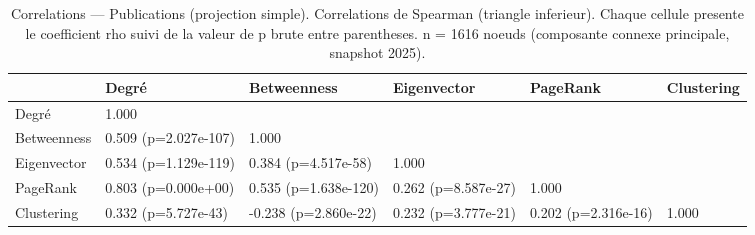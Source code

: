 \begin{table}
\caption{Correlations — Publications (projection simple). Correlations de Spearman (triangle inferieur). Chaque cellule presente le coefficient rho suivi de la valeur de p brute entre parentheses. n = 1616 noeuds (composante connexe principale, snapshot 2025).}
\label{tab:corr_heatmap_corr_publications_simple}
\begin{tabular}{llllll}
\toprule
 & Degré & Betweenness & Eigenvector & PageRank & Clustering \\
\midrule
Degré & 1.000 &  &  &  &  \\
Betweenness & 0.509
(p=2.027e-107) & 1.000 &  &  &  \\
Eigenvector & 0.534
(p=1.129e-119) & 0.384
(p=4.517e-58) & 1.000 &  &  \\
PageRank & 0.803
(p=0.000e+00) & 0.535
(p=1.638e-120) & 0.262
(p=8.587e-27) & 1.000 &  \\
Clustering & 0.332
(p=5.727e-43) & -0.238
(p=2.860e-22) & 0.232
(p=3.777e-21) & 0.202
(p=2.316e-16) & 1.000 \\
\bottomrule
\end{tabular}
\end{table}
